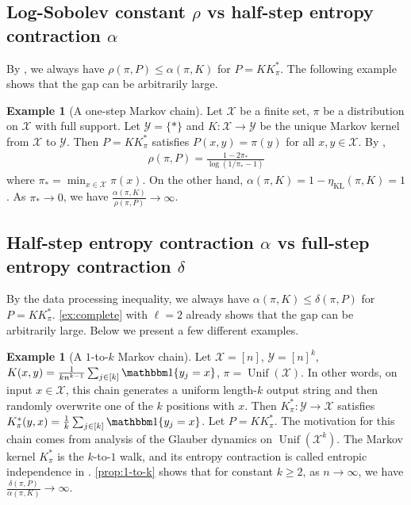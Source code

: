 \documentclass[11pt]{article}
\def\cX{\mathcal{X}}
\def\cY{\mathcal{Y}}
\DeclareMathOperator\Unif{\mathrm{Unif}}
\DeclareMathOperator\KL{\mathrm{KL}}
\newcommand{\nbyp}[1]{{\color{red}[Yury: #1]}}
\theoremstyle{definition}
\newtheorem{example}[theorem]{Example}
\begin{document}
\subsection{Log-Sobolev constant \texorpdfstring{$\rho$}{rho} vs half-step entropy contraction \texorpdfstring{$\alpha$}{alpha}} \label{sec:comparison:rho-vs-alpha}
By \cite{miclo1997remarques}, we always have $\rho(\pi, P) \le \alpha(\pi, K)$ for $P=KK_\pi^*$. The following example shows that the gap can be arbitrarily large.
\begin{example}[A one-step Markov chain] \label{ex:one-step}
  Let $\cX$ be a finite set, $\pi$ be a distribution on $\cX$ with full support.
  Let $\cY = \{*\}$ and $K: \cX \to \cY$ be the unique Markov kernel from $\cX$ to $\cY$.
  Then $P=KK_\pi^*$ satisfies $P(x,y)=\pi(y)$ for all $x,y\in \cX$.
  By \cite[Theorem A.1]{diaconis1996logarithmic},
  \begin{align}
    \rho(\pi, P) = \frac{1-2\pi_*}{\log(1/\pi_*-1)}
  \end{align}
  where $\pi_* = \min_{x\in \cX} \pi(x)$.
  On the other hand, $\alpha(\pi, K) = 1-\eta_{\KL}(\pi, K) = 1$.
  As $\pi_*\to 0$, we have $\frac{\alpha(\pi, K)}{\rho(\pi, P)} \to \infty$.
\end{example}
\subsection{Half-step entropy contraction \texorpdfstring{$\alpha$}{alpha} vs full-step entropy contraction \texorpdfstring{$\delta$}{delta}} \label{sec:comparison:alpha-vs-delta}
By the data processing inequality, we always have $\alpha(\pi, K) \le \delta(\pi, P)$ for $P=KK_\pi^*$.
\cref{ex:complete} with $\ell=2$ already shows that the gap can be arbitrarily large. Below we present a few different examples.
\begin{example}[A $1$-to-$k$ Markov chain] \label{ex:1-to-k}
  Let $\cX=[n]$, $\cY = [n]^k$, $K(x,y) = \frac 1{kn^{k-1}} \sum_{j\in [k]} \mathbbm1\{y_j=x\}$,
  $\pi = \Unif(\cX)$. In other words, on input $x\in \cX$, this chain generates a uniform length-$k$ output string and then randomly overwrite one of the $k$ positions with $x$.
  Then $K_\pi^*: \cY \to \cX$ satisfies $K_\pi^*(y,x) = \frac 1k \sum_{j\in [k]} \mathbbm1\{y_j=x\}$.
  Let $P=KK_\pi^*$.
  The motivation for this chain comes from analysis of the Glauber dynamics on $\Unif\left(\cX^k\right)$.
  The Markov kernel $K_\pi^*$ is the $k$-to-$1$ walk, and its entropy contraction is called entropic independence in \cite{AJKPV22}.
  \cref{prop:1-to-k} shows that for constant $k\ge 2$, as $n\to \infty$, we have $\frac{\delta(\pi, P)}{\alpha(\pi, K)} \to \infty$.
\end{example}
\end{document}
